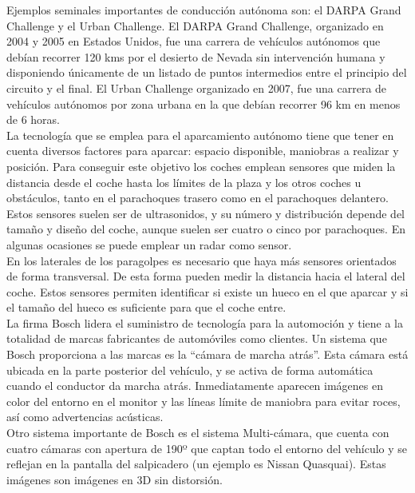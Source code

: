 Ejemplos seminales importantes de conducción autónoma son: el DARPA Grand Challenge y el Urban Challenge. El DARPA Grand Challenge, organizado en 2004 y 2005 en Estados Unidos, fue una carrera de vehículos autónomos que debían recorrer 120 kms por el desierto de Nevada sin intervención humana y disponiendo únicamente de un listado de puntos intermedios entre el principio del circuito y el final. El Urban Challenge organizado en 2007, fue una carrera de vehículos autónomos por zona urbana en la que debían recorrer 96 km en menos de 6 horas. \\

La tecnología que se emplea para el aparcamiento autónomo tiene que tener en cuenta diversos factores para aparcar: espacio disponible, maniobras a realizar y posición. Para conseguir este objetivo los coches emplean sensores que miden la distancia desde el coche hasta los límites de la plaza y los otros coches u obstáculos, tanto en el parachoques trasero como en el parachoques delantero. Estos sensores suelen ser de ultrasonidos, y su número y distribución depende del tamaño y diseño del coche, aunque suelen ser cuatro o cinco por parachoques. En algunas ocasiones se puede emplear un radar como sensor.\\

En los laterales de los paragolpes es necesario que haya más sensores orientados de forma transversal. De esta forma pueden medir la distancia hacia el lateral del coche. Estos sensores permiten identificar si existe un hueco en el que aparcar y si el tamaño del hueco es suficiente para que el coche entre.\\

La firma Bosch lidera el suministro de tecnología para la automoción y tiene a la totalidad de marcas fabricantes de automóviles como clientes. Un sistema que Bosch proporciona a las marcas es la ``cámara de marcha atrás''. Esta cámara está ubicada en la parte posterior del vehículo, y se activa de forma automática cuando el conductor da marcha atrás. Inmediatamente aparecen imágenes en color del entorno en el monitor y las líneas límite de maniobra para evitar roces, así como advertencias acústicas.\\

Otro sistema importante de Bosch es el sistema Multi-cámara, que cuenta con cuatro cámaras con apertura de 190º que captan todo el entorno del vehículo y se reflejan en la pantalla del salpicadero (un ejemplo es Nissan Quasquai). Estas imágenes son imágenes en 3D sin distorsión.\\

